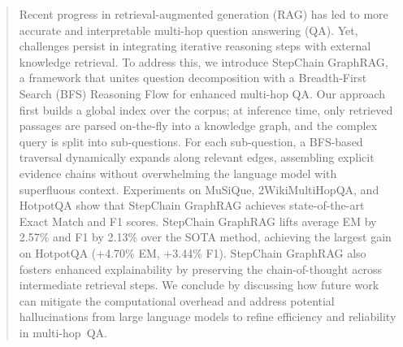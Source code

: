 \documentclass[runningheads]{llncs}
\begin{document}
\begin{abstract}
Recent progress in retrieval-augmented generation (RAG) has led to more accurate and interpretable multi-hop question answering (QA). Yet, challenges persist in integrating iterative reasoning steps with external knowledge retrieval. To address this, we introduce StepChain GraphRAG, a framework that unites question decomposition with a Breadth-First Search (BFS) Reasoning Flow for enhanced multi-hop QA. Our approach first builds a global index over the corpus; at inference time, only retrieved passages are parsed on‑the‑fly into a knowledge graph, and the complex query is split into sub‑questions. For each sub-question, a BFS-based traversal dynamically expands along relevant edges, assembling explicit evidence chains without overwhelming the language model with superfluous context. Experiments on MuSiQue, 2WikiMultiHopQA, and HotpotQA show that StepChain GraphRAG achieves state-of-the-art Exact Match and F1 scores. StepChain GraphRAG lifts average EM by 2.57\% and F1 by 2.13\% over the SOTA method, achieving the largest gain on HotpotQA (+4.70\% EM, +3.44\% F1). StepChain GraphRAG also fosters enhanced explainability by preserving the chain-of-thought across intermediate retrieval steps. We conclude by discussing how future work can mitigate the computational overhead and address potential hallucinations from large language models to refine efficiency and reliability in multi-hop~QA.

\end{abstract}

%
%
%


\end{document}
